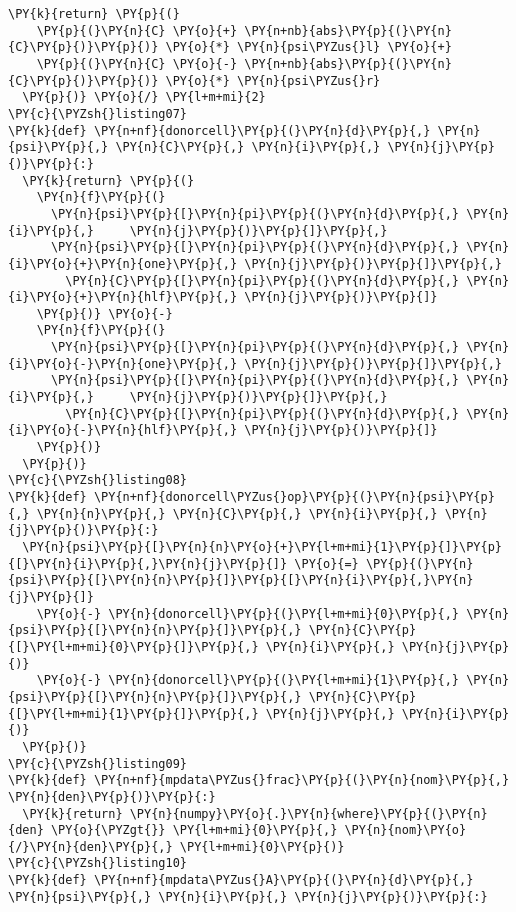\begin{Verbatim}[commandchars=\\\{\}]
  \PY{k}{return} \PY{p}{(}
    \PY{p}{(}\PY{n}{C} \PY{o}{+} \PY{n+nb}{abs}\PY{p}{(}\PY{n}{C}\PY{p}{)}\PY{p}{)} \PY{o}{*} \PY{n}{psi\PYZus{}l} \PY{o}{+} 
    \PY{p}{(}\PY{n}{C} \PY{o}{-} \PY{n+nb}{abs}\PY{p}{(}\PY{n}{C}\PY{p}{)}\PY{p}{)} \PY{o}{*} \PY{n}{psi\PYZus{}r}
  \PY{p}{)} \PY{o}{/} \PY{l+m+mi}{2}
\PY{c}{\PYZsh{}listing07}
\PY{k}{def} \PY{n+nf}{donorcell}\PY{p}{(}\PY{n}{d}\PY{p}{,} \PY{n}{psi}\PY{p}{,} \PY{n}{C}\PY{p}{,} \PY{n}{i}\PY{p}{,} \PY{n}{j}\PY{p}{)}\PY{p}{:}
  \PY{k}{return} \PY{p}{(}
    \PY{n}{f}\PY{p}{(}
      \PY{n}{psi}\PY{p}{[}\PY{n}{pi}\PY{p}{(}\PY{n}{d}\PY{p}{,} \PY{n}{i}\PY{p}{,}     \PY{n}{j}\PY{p}{)}\PY{p}{]}\PY{p}{,} 
      \PY{n}{psi}\PY{p}{[}\PY{n}{pi}\PY{p}{(}\PY{n}{d}\PY{p}{,} \PY{n}{i}\PY{o}{+}\PY{n}{one}\PY{p}{,} \PY{n}{j}\PY{p}{)}\PY{p}{]}\PY{p}{,} 
        \PY{n}{C}\PY{p}{[}\PY{n}{pi}\PY{p}{(}\PY{n}{d}\PY{p}{,} \PY{n}{i}\PY{o}{+}\PY{n}{hlf}\PY{p}{,} \PY{n}{j}\PY{p}{)}\PY{p}{]}
    \PY{p}{)} \PY{o}{-} 
    \PY{n}{f}\PY{p}{(}
      \PY{n}{psi}\PY{p}{[}\PY{n}{pi}\PY{p}{(}\PY{n}{d}\PY{p}{,} \PY{n}{i}\PY{o}{-}\PY{n}{one}\PY{p}{,} \PY{n}{j}\PY{p}{)}\PY{p}{]}\PY{p}{,} 
      \PY{n}{psi}\PY{p}{[}\PY{n}{pi}\PY{p}{(}\PY{n}{d}\PY{p}{,} \PY{n}{i}\PY{p}{,}     \PY{n}{j}\PY{p}{)}\PY{p}{]}\PY{p}{,} 
        \PY{n}{C}\PY{p}{[}\PY{n}{pi}\PY{p}{(}\PY{n}{d}\PY{p}{,} \PY{n}{i}\PY{o}{-}\PY{n}{hlf}\PY{p}{,} \PY{n}{j}\PY{p}{)}\PY{p}{]}
    \PY{p}{)} 
  \PY{p}{)}
\PY{c}{\PYZsh{}listing08}
\PY{k}{def} \PY{n+nf}{donorcell\PYZus{}op}\PY{p}{(}\PY{n}{psi}\PY{p}{,} \PY{n}{n}\PY{p}{,} \PY{n}{C}\PY{p}{,} \PY{n}{i}\PY{p}{,} \PY{n}{j}\PY{p}{)}\PY{p}{:}
  \PY{n}{psi}\PY{p}{[}\PY{n}{n}\PY{o}{+}\PY{l+m+mi}{1}\PY{p}{]}\PY{p}{[}\PY{n}{i}\PY{p}{,}\PY{n}{j}\PY{p}{]} \PY{o}{=} \PY{p}{(}\PY{n}{psi}\PY{p}{[}\PY{n}{n}\PY{p}{]}\PY{p}{[}\PY{n}{i}\PY{p}{,}\PY{n}{j}\PY{p}{]} 
    \PY{o}{-} \PY{n}{donorcell}\PY{p}{(}\PY{l+m+mi}{0}\PY{p}{,} \PY{n}{psi}\PY{p}{[}\PY{n}{n}\PY{p}{]}\PY{p}{,} \PY{n}{C}\PY{p}{[}\PY{l+m+mi}{0}\PY{p}{]}\PY{p}{,} \PY{n}{i}\PY{p}{,} \PY{n}{j}\PY{p}{)}
    \PY{o}{-} \PY{n}{donorcell}\PY{p}{(}\PY{l+m+mi}{1}\PY{p}{,} \PY{n}{psi}\PY{p}{[}\PY{n}{n}\PY{p}{]}\PY{p}{,} \PY{n}{C}\PY{p}{[}\PY{l+m+mi}{1}\PY{p}{]}\PY{p}{,} \PY{n}{j}\PY{p}{,} \PY{n}{i}\PY{p}{)}
  \PY{p}{)}
\PY{c}{\PYZsh{}listing09}
\PY{k}{def} \PY{n+nf}{mpdata\PYZus{}frac}\PY{p}{(}\PY{n}{nom}\PY{p}{,} \PY{n}{den}\PY{p}{)}\PY{p}{:}
  \PY{k}{return} \PY{n}{numpy}\PY{o}{.}\PY{n}{where}\PY{p}{(}\PY{n}{den} \PY{o}{\PYZgt{}} \PY{l+m+mi}{0}\PY{p}{,} \PY{n}{nom}\PY{o}{/}\PY{n}{den}\PY{p}{,} \PY{l+m+mi}{0}\PY{p}{)}
\PY{c}{\PYZsh{}listing10}
\PY{k}{def} \PY{n+nf}{mpdata\PYZus{}A}\PY{p}{(}\PY{n}{d}\PY{p}{,} \PY{n}{psi}\PY{p}{,} \PY{n}{i}\PY{p}{,} \PY{n}{j}\PY{p}{)}\PY{p}{:}

\end{Verbatim}
